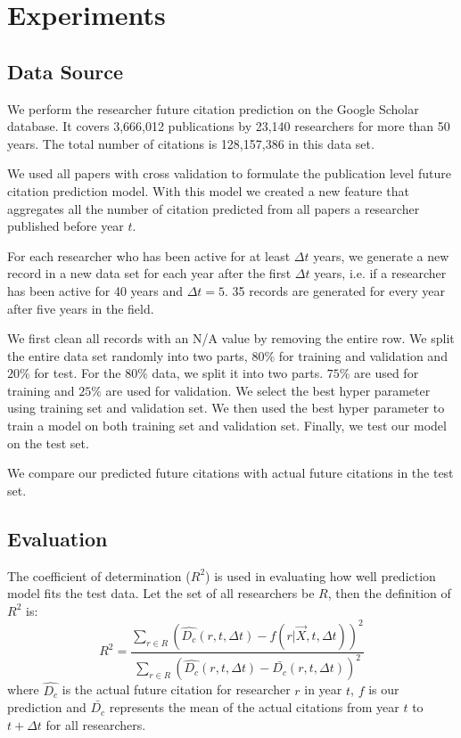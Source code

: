 \section{Experiments}
\subsection{Data Source}
We perform the researcher future citation prediction on the Google Scholar database.
It covers 3,666,012 publications by 23,140 researchers for more than 50 years.
The total number of citations is 128,157,386 in this data set.

We used all papers with cross validation to formulate the publication level future citation prediction model.
With this model we created a new feature that aggregates all the number of citation predicted from all papers a researcher published before year $t$.

For each researcher who has been active for at least $\Delta t$ years, we generate a new record in a new data set for each year after the first $\Delta t$ years, i.e. if a researcher has been active for 40 years and $\Delta t=5$. 35 records are generated for every year after five years in the field. 

We first clean all records with an N/A value by removing the entire row.
We split the entire data set randomly into two parts, $80\%$ for training and validation and $20\%$ for test.
For the $80\%$ data, we split it into two parts. $75\%$ are used for training and $25\%$ are used for validation.
We select the best hyper parameter using training set and validation set. We then used the best hyper parameter to train a model on both training set and validation set. Finally, we test our model on the test set.

We compare our predicted future citations with actual future citations in the test set.

\subsection{Evaluation}
The coefficient of determination ($R^2$) is used in evaluating how well prediction model fits the test data. Let the set of all researchers be $R$, then the definition of $R^2$ is:
\[R^2=\frac{\sum_{r \in R}(\hat{D_c}(r,t,\Delta t)-f(r|\vec{X},t,\Delta t))^2}{\sum_{r \in R}(\hat{D_c}(r,t,\Delta t)-\bar{D_c}(r,t,\Delta t))^2}\]
where $\hat{D_c}$ is the actual future citation for researcher $r$ in year $t$, $f$ is our prediction
and $\bar{D_c}$ represents the mean of the actual citations from year $t$ to $t+\Delta t$ for all researchers.

